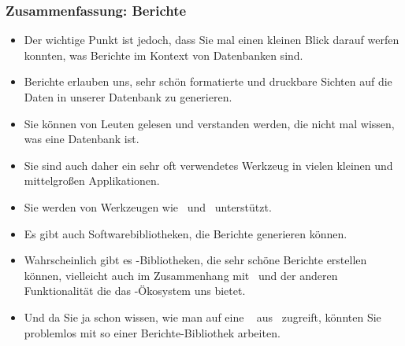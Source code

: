 \documentclass[aspectratio=169,mathserif,notheorems]{beamer}%
\begin{document}
\begin{frame}%
\frametitle{Zusammenfassung: Berichte}%
%
\begin{itemize}%
\item Der wichtige Punkt ist jedoch, dass Sie mal einen kleinen Blick darauf werfen konnten, was Berichte im Kontext von Datenbanken sind.%
%
\item<2-> Berichte erlauben uns, sehr schön formatierte und druckbare Sichten auf die Daten in unserer Datenbank zu generieren.%
%
\item<3-> Sie können von Leuten gelesen und verstanden werden, die nicht mal wissen, was eine Datenbank ist.%
%
\item<4-> Sie sind auch daher ein sehr oft verwendetes Werkzeug in vielen kleinen und mittelgroßen Applikationen.%
%
\item<5-> Sie werden von Werkzeugen wie \libreofficeBase\ und \microsoftAccess\ unterstützt.%
%
\item<6-> Es gibt auch Softwarebibliotheken, die Berichte generieren können.%
%
\item<7-> Wahrscheinlich gibt es \python-Bibliotheken, die sehr schöne Berichte erstellen können, vielleicht auch im Zusammenhang mit \matplotlib\ und der anderen Funktionalität die das \python-Ökosystem uns bietet.%
%
\item<8-> Und da Sie ja schon wissen, wie man auf eine \postgresql\  aus \python\ zugreift, könnten Sie problemlos mit so einer Berichte-Bibliothek arbeiten.%
\end{itemize}%
\end{frame}%
\endPresentation%
\end{document}

